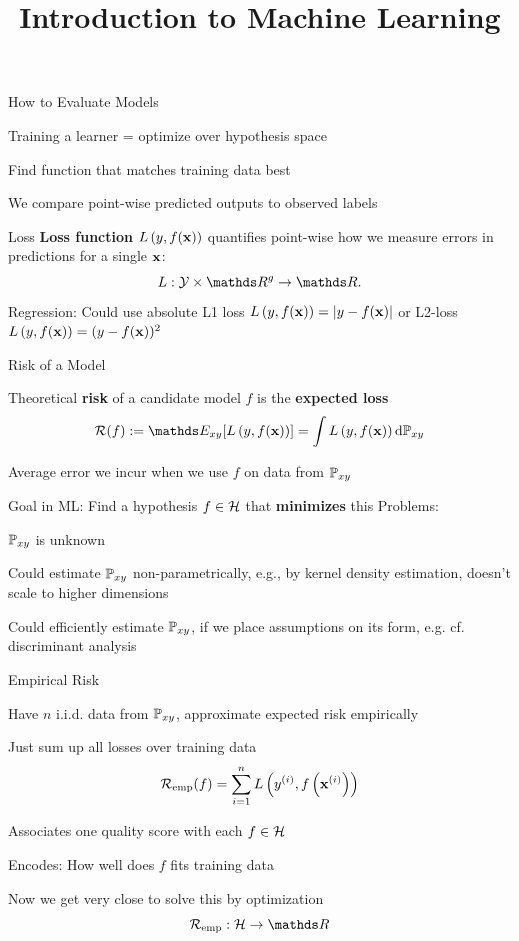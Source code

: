 \documentclass[11pt,compress,t,notes=noshow, xcolor=table]{beamer}
\title{Introduction to Machine Learning}
\begin{document}


\begin{framei}{How to Evaluate Models}
\item Training a learner = optimize over hypothesis space
\item Find function that matches training data best
\item We compare point-wise predicted outputs to 
observed labels
\vfill
{} %
\end{framei}


\begin{framev}{Loss}
\textbf{Loss function} $L\left(y, f(\mathbf{x})\right)$ quantifies point-wise how we measure errors in predictions for a single $\mathbf{x}$:
$$
L: \Yspace \times \R^g \to \R.
$$
Regression: Could use absolute L1 loss  $L\left(y, f(\mathbf{x})\right) = |y-f(\mathbf{x})|$
or L2-loss $L\left(y, f(\mathbf{x})\right) = (y - f(\mathbf{x}))^2$
\end{framev}


\begin{framei}{Risk of a Model}
\item Theoretical \textbf{risk} of a candidate model $f$ is the \textbf{expected loss}
$$ \riskf := \E_{xy} [\Lxy] = \int \Lxy \text{d}\Pxy $$
\item Average error we incur when we use $f$ on data from $\mathbb{P}_{xy}$
\item Goal in ML: Find a hypothesis $f \in \mathcal{H}$ that \textbf{minimizes} this
\vfill
Problems:
\item $\mathbb{P}_{xy}$ is unknown
\item Could estimate $\mathbb{P}_{xy}$ non-parametrically, e.g., by kernel density estimation,  doesn't scale to higher dimensions
\item Could efficiently estimate $\mathbb{P}_{xy}$, if we place assumptions on its form, e.g. cf. discriminant analysis
\end{framei}


\begin{framei}{Empirical Risk}
\item Have $n$ i.i.d. data from $\mathbb{P}_{xy}$, approximate expected risk empirically
\item Just sum up all losses over training data
$$
\mathcal{R}_{\text{emp}}(f) = \sum\limits_{i=1}^n L\left(y^{(i)}, f\left(\mathbf{x}^{(i)}\right)\right)
$$
\item Associates one quality score with each $f \in \mathcal{H}$
\item Encodes: How well does $f$ fits training data
\item Now we get very close to solve this by optimization 
$$
\riske: \Hspace \to \R
$$
\end{framei}
\end{document}
